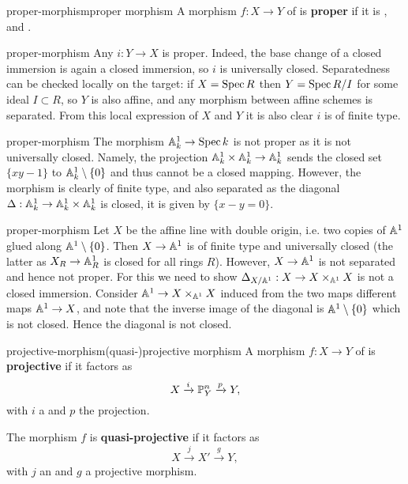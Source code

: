 \begin{topic}{proper-morphism}{proper morphism}
    A morphism $f : X \to Y$ of  is \textbf{proper} if it is ,  and .
\end{topic}

\begin{example}{proper-morphism}
    Any  $i : Y \to X$ is proper. Indeed, the base change of a closed immersion is again a closed immersion, so $i$ is universally closed. Separatedness can be checked locally on the target: if $X = \Spec R$ then $Y = \Spec R / I$ for some ideal $I \subset R$, so $Y$ is also affine, and any morphism between affine schemes is separated. From this local expression of $X$ and $Y$ it is also clear $i$ is of finite type.
\end{example}

\begin{example}{proper-morphism}
    The morphism $\AA_k^1 \to \Spec k$ is not proper as it is not universally closed. Namely, the projection $\AA^1_k \times \AA^1_k \to \AA^1_k$ sends the closed set $\{ xy - 1 \}$ to $\AA^1_k \setminus \{ 0 \}$ and thus cannot be a closed mapping. However, the morphism is clearly of finite type, and also separated as the diagonal $\Delta : \AA^1_k \to \AA^1_k \times \AA^1_k$ is closed, it is given by $\{ x - y = 0 \}$.
\end{example}

\begin{example}{proper-morphism}
    Let $X$ be the affine line with double origin, i.e. two copies of $\AA^1$ glued along $\AA^1 \setminus \{ 0 \}$. Then $X \to \AA^1$ is of finite type and universally closed (the latter as $X_R \to \AA^1_R$ is closed for all rings $R$). However, $X \to \AA^1$ is not separated and hence not proper. For this we need to show $\Delta_{X / \AA^1} : X \to X \times_{\AA^1} X$ is not a closed immersion. Consider $\AA^1 \to X \times_{\AA^1} X$ induced from the two maps different maps $\AA^1 \to X$, and note that the inverse image of the diagonal is $\AA^1 \setminus \{ 0 \}$ which is not closed. Hence the diagonal is not closed.
\end{example}

\begin{topic}{projective-morphism}{(quasi-)projective morphism}
    A morphism $f : X \to Y$ of  is \textbf{projective} if it factors as
    \[ X \xrightarrow{i} \PP^n_Y \xrightarrow{p} Y , \]
    with $i$ a  and $p$ the projection.
    
    The morphism $f$ is \textbf{quasi-projective} if it factors as
    \[ X \xrightarrow{j} X' \xrightarrow{g} Y , \]
    with $j$ an  and $g$ a projective morphism.
\end{topic}

